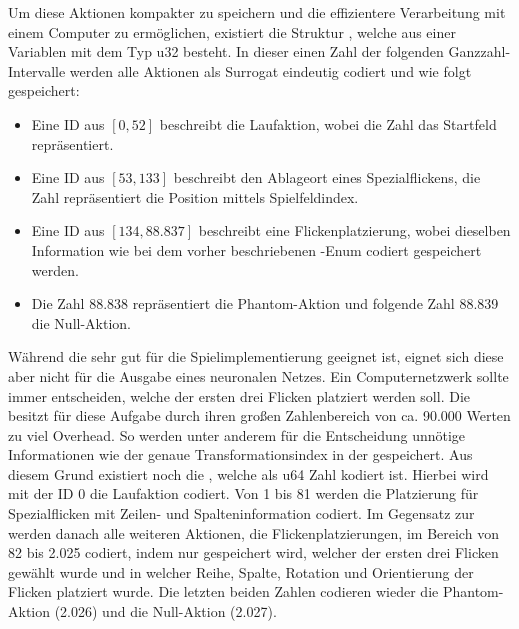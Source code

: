 

Um diese Aktionen kompakter zu speichern und die effizientere Verarbeitung mit einem Computer zu ermöglichen, existiert die Struktur , welche aus einer Variablen mit dem Typ \ac{u32} besteht. In dieser einen Zahl der folgenden Ganzzahl-Intervalle werden alle Aktionen als Surrogat eindeutig codiert und wie folgt gespeichert:

\begin{itemize}
    \item Eine \ac{ID} aus $[0, 52]$ beschreibt die Laufaktion, wobei die Zahl das Startfeld repräsentiert.
    \item Eine \ac{ID} aus $[53, 133]$ beschreibt den Ablageort eines Spezialflickens, die Zahl repräsentiert die Position mittels Spielfeldindex.
    \item Eine \ac{ID} aus $[134, 88.837]$ beschreibt eine Flickenplatzierung, wobei dieselben Information wie bei dem vorher beschriebenen -Enum codiert gespeichert werden.
    \item Die Zahl 88.838 repräsentiert die Phantom-Aktion und folgende Zahl 88.839 die Null-Aktion.
\end{itemize}

Während die  sehr gut für die Spielimplementierung geeignet ist, eignet sich diese aber nicht für die Ausgabe eines neuronalen Netzes. Ein Computernetzwerk sollte immer entscheiden, welche der ersten drei Flicken platziert werden soll. Die  besitzt für diese Aufgabe durch ihren großen Zahlenbereich von ca. 90.000 Werten zu viel Overhead. So werden unter anderem für die Entscheidung unnötige Informationen wie der genaue Transformationsindex in der  gespeichert. Aus diesem Grund existiert noch die , welche als \ac{u64} Zahl kodiert ist. Hierbei wird mit der \ac{ID} 0 die Laufaktion codiert. Von 1 bis 81 werden die Platzierung für Spezialflicken mit Zeilen- und Spalteninformation codiert. Im Gegensatz zur  werden danach alle weiteren Aktionen, die Flickenplatzierungen, im Bereich von 82 bis 2.025 codiert, indem nur gespeichert wird, welcher der ersten drei Flicken gewählt wurde und in welcher Reihe, Spalte, Rotation und Orientierung der Flicken platziert wurde. Die letzten beiden Zahlen codieren wieder die Phantom-Aktion (2.026) und die Null-Aktion (2.027).

